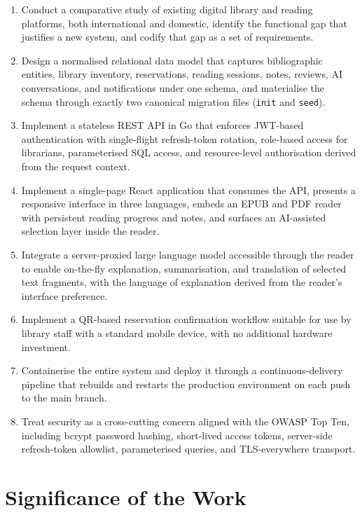 \documentclass[12pt,a4paper]{report}
\begin{document}
\begin{enumerate}[label=\arabic*., leftmargin=*]
    \item Conduct a comparative study of existing digital library and
    reading platforms, both international and domestic, identify the
    functional gap that justifies a new system, and codify that gap as a
    set of requirements.
    \item Design a normalised relational data model that captures
    bibliographic entities, library inventory, reservations, reading
    sessions, notes, reviews, AI conversations, and notifications under
    one schema, and materialise the schema through exactly two canonical
    migration files (\texttt{init} and \texttt{seed}).
    \item Implement a stateless REST API in Go that enforces JWT-based
    authentication with single-flight refresh-token rotation, role-based
    access for librarians, parameterised SQL access, and resource-level
    authorisation derived from the request context.
    \item Implement a single-page React application that consumes the API,
    presents a responsive interface in three languages, embeds an EPUB
    and PDF reader with persistent reading progress and notes, and
    surfaces an AI-assisted selection layer inside the reader.
    \item Integrate a server-proxied large language model accessible
    through the reader to enable on-the-fly explanation, summarisation,
    and translation of selected text fragments, with the language of
    explanation derived from the reader's interface preference.
    \item Implement a QR-based reservation confirmation workflow suitable
    for use by library staff with a standard mobile device, with no
    additional hardware investment.
    \item Containerise the entire system and deploy it through a
    continuous-delivery pipeline that rebuilds and restarts the
    production environment on each push to the main branch.
    \item Treat security as a cross-cutting concern aligned with the OWASP
    Top Ten, including bcrypt password hashing, short-lived access
    tokens, server-side refresh-token allowlist, parameterised queries,
    and TLS-everywhere transport.
\end{enumerate}

\section{Significance of the Work}
\end{document}
